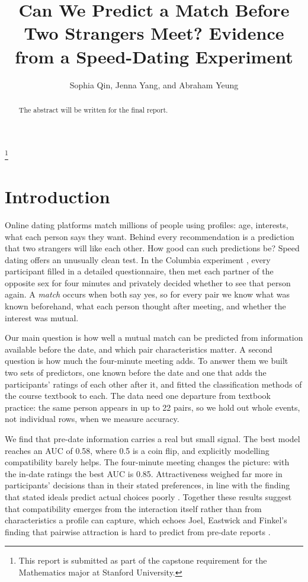 \documentclass[11pt,letterpaper,reqno]{amsart}
\numberwithin{equation}{subsection}
\theoremstyle{definition}
\numberwithin{thm}{subsection}
\begin{document}
\onehalfspacing

\title[Predicting a Match Before Two Strangers Meet]{Can We Predict a Match Before Two Strangers Meet? Evidence from a Speed-Dating Experiment}
\author{Sophia Qin, Jenna Yang, and Abraham Yeung}

\thanks{This report is submitted as part of the capstone requirement for the Mathematics major at Stanford University.}

\begin{abstract}
The abstract will be written for the final report.
\end{abstract}

\maketitle

\section{Introduction}

Online dating platforms match millions of people using profiles: age, interests, what each person says they want.
Behind every recommendation is a prediction that two strangers will like each other. How good can such predictions
be? Speed dating offers an unusually clean test. In the Columbia experiment \cite[Section II]{Fisman:2006}, every
participant filled in a detailed questionnaire, then met each partner of the opposite sex for four minutes and
privately decided whether to see that person again. A \emph{match} occurs when both say yes, so for every pair we
know what was known beforehand, what each person thought after meeting, and whether the interest was mutual.

Our main question is how well a mutual match can be predicted from information available before the date, and which
pair characteristics matter. A second question is how much the four-minute meeting adds. To answer them we built two
sets of predictors, one known before the date and one that adds the participants' ratings of each other after it,
and fitted the classification methods of the course textbook to each. The data need one departure from textbook
practice: the same person appears in up to 22 pairs, so we hold out whole events, not individual rows, when we
measure accuracy.

We find that pre-date information carries a real but small signal. The best model reaches an AUC of 0.58, where 0.5 is
a coin flip, and explicitly modelling compatibility barely helps. The four-minute meeting changes the picture: with
the in-date ratings the best AUC is 0.85. Attractiveness weighed far more in participants' decisions than in their
stated preferences, in line with the finding that stated ideals predict actual choices poorly \cite{Eastwick:2008}.
Together these results suggest that compatibility emerges from the interaction itself rather than from
characteristics a profile can capture, which echoes Joel, Eastwick and Finkel's finding that pairwise attraction is
hard to predict from pre-date reports \cite{Joel:2017}.
\end{document}
